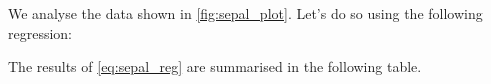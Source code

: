 \documentclass{article}
\begin{document}


We analyse the data shown in \ref{fig:sepal_plot}.
Let’s do so using the following regression:



The results of \ref{eq:sepal_reg} are summarised in the following table.


\end{document}
